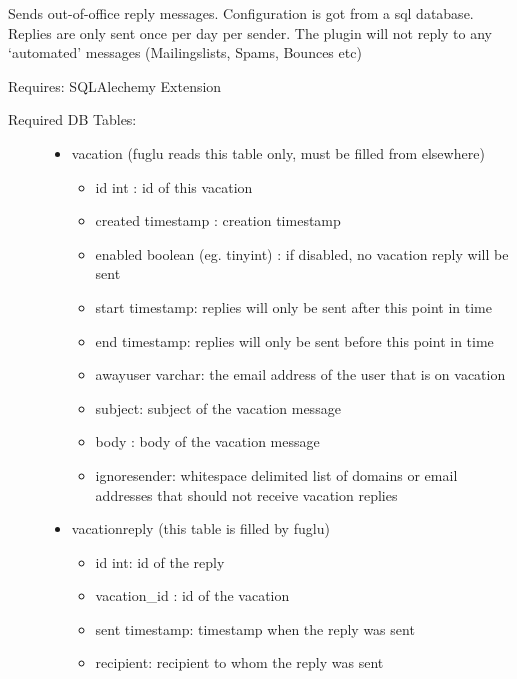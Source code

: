 \documentclass[letterpaper,10pt,english]{sphinxmanual}
\begin{document}
Sends out-of-office reply messages. Configuration is got from a sql database. Replies are only sent once per day per sender. The plugin will not reply to any `automated' messages (Mailingslists, Spams, Bounces etc)

Requires: SQLAlechemy Extension
\begin{description}
\item[{Required DB Tables:}] \leavevmode\begin{itemize}
\item {} 
vacation (fuglu reads this table only, must be filled from elsewhere)
\begin{itemize}
\item {} 
id int : id of this vacation

\item {} 
created timestamp :  creation timestamp

\item {} 
enabled boolean (eg. tinyint) : if disabled, no vacation reply will be sent

\item {} 
start timestamp: replies will only be sent after this point in time

\item {} 
end timestamp: replies will only be sent before this point in time

\item {} 
awayuser varchar: the email address of the user that is on vacation

\item {} 
subject: subject of the vacation message

\item {} 
body : body of the vacation message

\item {} 
ignoresender: whitespace delimited list of domains or email addresses that should not receive vacation replies

\end{itemize}

\item {} 
vacationreply (this table is filled by fuglu)
\begin{itemize}
\item {} 
id int: id of the reply

\item {} 
vacation\_id : id of the vacation

\item {} 
sent timestamp: timestamp when the reply was sent

\item {} 
recipient: recipient to whom the reply was sent

\end{itemize}

\end{itemize}

\end{description}
\end{document}
